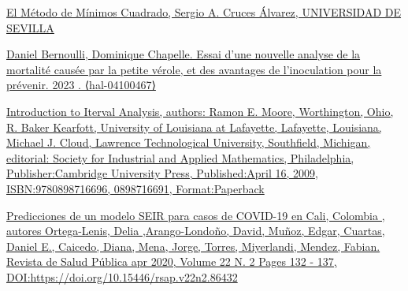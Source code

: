 \documentclass{article}
\begin{document}
\begin{itemize}
\begin{thebibliography}
    \bibitem[5]{}\href{https://personal.us.es/sergio/PDocente/lectura.pdf}{El Método de Mínimos Cuadrado, Sergio A. Cruces Álvarez, UNIVERSIDAD DE SEVILLA}
     \label{sec:5}
    
    \bibitem[6]{}\href{https://inria.hal.science/hal-04100467}{Daniel Bernoulli, Dominique Chapelle. Essai d'une nouvelle analyse de la mortalité causée par la petite vérole, et des avantages de l'inoculation pour la prévenir. 2023
   . ⟨hal-04100467⟩
    }
     \label{sec:6}
    
    \bibitem[7] {}\href{ https://www.google.com/books/edition/Introduction_to_Interval_Analysis/kd8FmmN7sAoC?hl=en&gbpv=0 }{Introduction to Iterval Analysis, authors:
    Ramon E. Moore, Worthington, Ohio, R. Baker Kearfott, University of Louisiana at Lafayette, Lafayette, Louisiana, Michael J. Cloud, Lawrence Technological University, Southfield, Michigan, editorial: Society for Industrial and Applied Mathematics, Philadelphia,  Publisher:Cambridge University Press, Published:April 16, 2009, ISBN:9780898716696, 0898716691, 
Format:Paperback}
    
     \label{sec:7}
    
    \bibitem[8] {}\href{https://www.scielosp.org/pdf/rsap/2020.v22n2/132-137/es}{Predicciones de un modelo SEIR para casos de COVID-19 en Cali, Colombia , autores Ortega-Lenis, Delia ,Arango-Londoño, David, Muñoz, Edgar, Cuartas, Daniel E., Caicedo, Diana, Mena, Jorge, Torres, Miyerlandi, Mendez, Fabian.  Revista de Salud Pública apr 2020, Volume 22 N. 2 Pages 132 - 137,  DOI:https://doi.org/10.15446/rsap.v22n2.86432  }
     \label{sec:8}
    
\end{thebibliography}
\end{itemize}
\end{document}
